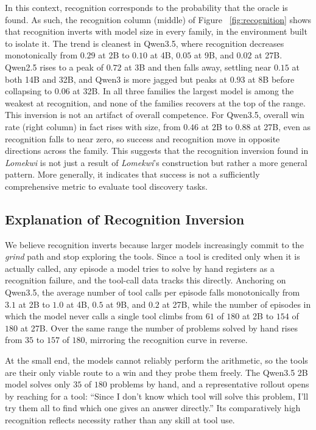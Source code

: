 \documentclass{article}
\begin{document}
In this context, recognition corresponds to the probability that the oracle is found. As such, the recognition column (middle) of Figure ~\ref{fig:recognition} shows that recognition inverts with model size in every family, in the environment built to isolate it. The trend is cleanest in Qwen3.5, where recognition decreases monotonically from $0.29$ at 2B to $0.10$ at 4B, $0.05$ at 9B, and $0.02$ at 27B. Qwen2.5 rises to a peak of $0.72$ at 3B and then falls away, settling near $0.15$ at both 14B and 32B, and Qwen3 is more jagged but peaks at $0.93$ at 8B before collapsing to $0.06$ at 32B. In all three families the largest model is among the weakest at recognition, and none of the families recovers at the top of the range. This inversion is not an artifact of overall competence. For Qwen3.5, overall win rate (right column) in fact rises with size, from $0.46$ at 2B to $0.88$ at 27B, even as recognition falls to near zero, so success and recognition move in opposite directions across the family. This suggests that the recognition inversion found in \emph{Lomekwi} is not just a result of \emph{Lomekwi}'s construction but rather a more general pattern. More generally, it indicates that success is not a sufficiently comprehensive metric to evaluate tool discovery tasks.

\subsection{Explanation of Recognition Inversion}
\label{subsec:exp-inversion}

We believe recognition inverts because larger models increasingly commit to the \emph{grind} path and stop exploring the tools. Since a tool is credited only when it is actually called, any episode a model tries to solve by hand registers as a recognition failure, and the tool-call data tracks this directly. Anchoring on Qwen3.5, the average number of tool calls per episode falls monotonically from $3.1$ at 2B to $1.0$ at 4B, $0.5$ at 9B, and $0.2$ at 27B, while the number of episodes in which the model never calls a single tool climbs from $61$ of $180$ at 2B to $154$ of $180$ at 27B. Over the same range the number of problems solved by hand rises from $35$ to $157$ of $180$, mirroring the recognition curve in reverse.

At the small end, the models cannot reliably perform the arithmetic, so the tools are their only viable route to a win and they probe them freely. The Qwen3.5 2B model solves only $35$ of $180$ problems by hand, and a representative rollout opens by reaching for a tool: ``Since I don't know which tool will solve this problem, I'll try them all to find which one gives an answer directly.'' Its comparatively high recognition reflects necessity rather than any skill at tool use.
\end{document}
